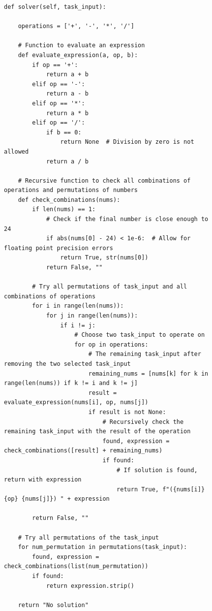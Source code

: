 \begin{figure}[ht]
\begin{lstlisting}[style=pythonstyle, caption={Final code based on search algorithm for Game of 24.}]
def solver(self, task_input):

    operations = ['+', '-', '*', '/']

    # Function to evaluate an expression
    def evaluate_expression(a, op, b):
        if op == '+':
            return a + b
        elif op == '-':
            return a - b
        elif op == '*':
            return a * b
        elif op == '/':
            if b == 0:
                return None  # Division by zero is not allowed
            return a / b

    # Recursive function to check all combinations of operations and permutations of numbers
    def check_combinations(nums):
        if len(nums) == 1:
            # Check if the final number is close enough to 24
            if abs(nums[0] - 24) < 1e-6:  # Allow for floating point precision errors
                return True, str(nums[0])
            return False, ""

        # Try all permutations of task_input and all combinations of operations
        for i in range(len(nums)):
            for j in range(len(nums)):
                if i != j:
                    # Choose two task_input to operate on
                    for op in operations:
                        # The remaining task_input after removing the two selected task_input
                        remaining_nums = [nums[k] for k in range(len(nums)) if k != i and k != j]
                        result = evaluate_expression(nums[i], op, nums[j])
                        if result is not None:
                            # Recursively check the remaining task_input with the result of the operation
                            found, expression = check_combinations([result] + remaining_nums)
                            if found:
                                # If solution is found, return with expression
                                return True, f"({nums[i]} {op} {nums[j]}) " + expression

        return False, ""

    # Try all permutations of the task_input
    for num_permutation in permutations(task_input):
        found, expression = check_combinations(list(num_permutation))
        if found:
            return expression.strip()

    return "No solution"

\end{lstlisting}
\end{figure}
